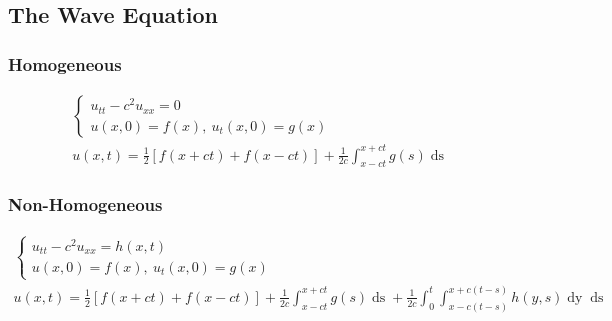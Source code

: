 \subsection{The Wave Equation}
\subsubsection*{Homogeneous}
\begin{gather*}
\begin{cases}
u_{tt} - c^{2}u_{xx} = 0\\
u(x,0) = f(x),\ u_{t}(x,0) = g(x)
\end{cases}\\
u(x,t) = \frac{1}{2}\left[f(x+ct) + f(x-ct)\right] + \frac{1}{2c}\int_{x-ct}^{x+ct}g(s)\mathop{ds}
\end{gather*}
\subsubsection*{Non-Homogeneous}
\begin{gather*}
\begin{cases}
u_{tt} - c^{2}u_{xx} = h(x,t)\\
u(x,0) = f(x),\ u_{t}(x,0) = g(x)
\end{cases}\\
u(x,t) = \frac{1}{2}\left[f(x+ct) + f(x-ct)\right] + \frac{1}{2c}\int_{x-ct}^{x+ct}g(s)\mathop{ds} +
\frac{1}{2c}\int_{0}^{t}\int_{x-c(t-s)}^{x+c(t-s)}h(y,s)\mathop{dy}\mathop{ds}
\end{gather*}
